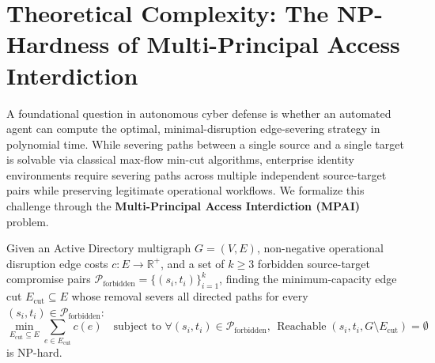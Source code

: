 \section[Theoretical Complexity: NP-Hardness of Edge-Severing]{Theoretical Complexity: The NP-Hardness of Multi-Principal Access Interdiction}
A foundational question in autonomous cyber defense is whether an automated agent can compute the optimal, minimal-disruption edge-severing strategy in polynomial time. While severing paths between a single source and a single target is solvable via classical max-flow min-cut algorithms, enterprise identity environments require severing paths across multiple independent source-target pairs while preserving legitimate operational workflows. We formalize this challenge through the \textbf{Multi-Principal Access Interdiction (MPAI)} problem.

\begin{theorem}
\label{thm:nphardness}
Given an Active Directory multigraph $G = (V, E)$, non-negative operational disruption edge costs $c: E \to \mathbb{R}^+$, and a set of $k \ge 3$ forbidden source-target compromise pairs $\mathcal{P}_{\text{forbidden}} = \{(s_i, t_i)\}_{i=1}^k$, finding the minimum-capacity edge cut $E_{\text{cut}} \subseteq E$ whose removal severs all directed paths for every $(s_i, t_i) \in \mathcal{P}_{\text{forbidden}}$:
\begin{equation}
\min_{E_{\text{cut}} \subseteq E} \sum_{e \in E_{\text{cut}}} c(e) \quad \text{subject to } \forall (s_i, t_i) \in \mathcal{P}_{\text{forbidden}}, \, \operatorname{Reachable}(s_i, t_i, G \setminus E_{\text{cut}}) = \emptyset
\end{equation}
is NP-hard.
\end{theorem}

